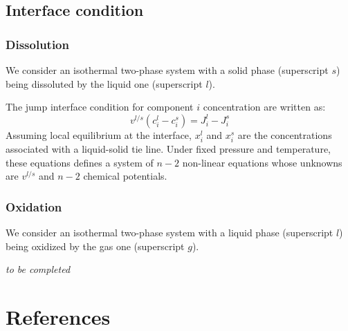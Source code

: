 \documentclass[3p]{elsarticle}
\begin{document}
\subsection{Interface condition}

\subsubsection{Dissolution}

We consider an isothermal two-phase system with a solid phase (superscript $s$) being dissoluted by the liquid one (superscript $l$).

The jump interface condition for component $i$ concentration are written as:
\begin{equation}
v^{l/s} \left(c_i^l-c_i^s\right) = J_i^l - J_i^s
\end{equation}
Assuming local equilibrium at the interface, $x_i^l$ and $x_i^s$ are the concentrations associated with a liquid-solid tie line. 
Under fixed pressure and temperature, these equations defines a system of $n-2$ non-linear equations whose unknowns are $v^{l/s}$ and $n-2$ chemical potentials.

\subsubsection{Oxidation}

We consider an isothermal two-phase system with a liquid phase (superscript $l$) being oxidized by the gas one (superscript $g$).

\emph{to be completed}

\section*{References}


\end{document}

